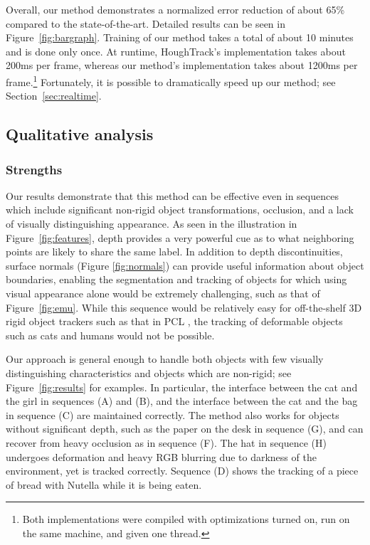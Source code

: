 \documentclass[journal]{IEEEtran}
\newcommand{\todoCR}[1]{}
\begin{document}
Overall, our method demonstrates a normalized error reduction of about 65\% compared to the state-of-the-art.  Detailed results can be seen in Figure~\ref{fig:bargraph}.  Training of our method takes a total of about 10 minutes and is done only once.  At runtime, HoughTrack's implementation takes about 200ms per frame, whereas our method's implementation takes about 1200ms per frame.\footnote{Both implementations were compiled with optimizations turned on, run on the same machine, and given one thread.}  Fortunately, it is possible to dramatically speed up our method; see Section~\ref{sec:realtime}.  \todoCR{These timing results were from Rg.  It'd be better for everything to be from Aluminum.}

\subsection{Qualitative analysis}

\subsubsection{Strengths}

Our results demonstrate that this method can be effective even in sequences which include significant non-rigid object transformations, occlusion, and a lack of visually distinguishing appearance. As seen in the illustration in Figure~\ref{fig:features}, depth provides a very powerful cue as to what neighboring points are likely to share the same label.  In addition to depth discontinuities, surface normals (Figure \ref{fig:normals}) can provide useful information about object boundaries, enabling the segmentation and tracking of objects for which using visual appearance alone would be extremely challenging, such as that of Figure~\ref{fig:emu}. While this sequence would be relatively easy for off-the-shelf 3D rigid object trackers such as that in PCL \cite{rusu2011a}, the tracking of deformable objects such as cats and humans would not be possible.

Our approach is general enough to handle both objects with few visually distinguishing characteristics and objects which are non-rigid; see Figure~\ref{fig:results} for examples.  In particular, the interface between the cat and the girl in sequences (A) and (B), and the interface between the cat and the bag in sequence (C) are maintained correctly. The method also works for objects without significant depth, such as the paper on the desk in sequence (G), and can recover from heavy occlusion as in sequence (F).  The hat in sequence (H) undergoes deformation and heavy RGB blurring due to darkness of the environment, yet is tracked correctly.  Sequence (D) shows the tracking of a piece of bread with Nutella while it is being eaten.
\end{document}
